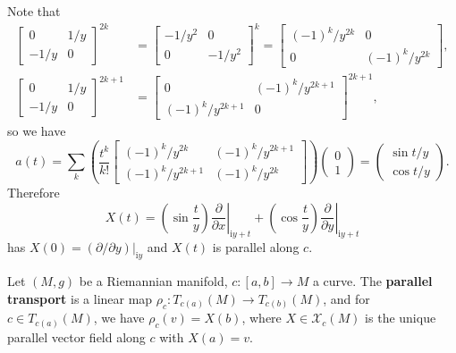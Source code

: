 \documentclass[letter-paper]{tufte-book}
\newenvironment{example}[1][Example]{\begin{trivlist}
\item[\hskip \labelsep {\bfseries #1}]}{\end{trivlist}}
\begin{document}
\begin{example}
  Note that
  \begin{align*}
    \left[\begin{matrix}0 & 1/y \\ -1/y & 0\end{matrix}\right]^{2k} 
      &= \left[\begin{matrix}-1/y^2 & 0 \\ 0 & -1/y^2\end{matrix}\right]^{k}
       = \left[\begin{matrix}(-1)^k/y^{2k} & 0 \\ 0 & (-1)^k/y^{2k}\end{matrix}\right],\\
    \left[\begin{matrix}0 & 1/y \\ -1/y & 0\end{matrix}\right]^{2k+1} 
      &= \left[\begin{matrix}0 & (-1)^k/y^{2k+1} \\ (-1)^k/y^{2k+1} & 0\end{matrix}\right]^{2k+1},
  \end{align*}
  so we have
  \begin{equation*}
    a(t) = \sum_k \left(\frac{t^k}{k!}\left[\begin{matrix}(-1)^k/y^{2k} & (-1)^k/y^{2k+1} \\ (-1)^k/y^{2k+1} & (-1)^k/y^{2k}\end{matrix}\right] \right)\begin{pmatrix}0\\ 1\end{pmatrix} = \begin{pmatrix}\sin t/y\\ \cos t/y\end{pmatrix}.
  \end{equation*}
  Therefore
  \begin{equation*}
    X(t) = \left(\sin\frac{t}{y}\right) \left.\frac{\partial}{\partial x}\right|_{\mathrm{i}y+t} + \left(\cos\frac{t}{y}\right) \left.\frac{\partial}{\partial y}\right|_{\mathrm{i}y+t}
  \end{equation*}
  has $X(0) = (\partial / \partial y)|_{\mathrm{i}y}$ and $X(t)$ is parallel along $c$.
\end{example}

Let $(M,g)$ be a Riemannian manifold, $c:[a,b] \to M$ a curve. The \textbf{parallel transport} is a linear map $\rho_c : T_{c(a)}(M) \to T_{c(b)}(M)$, and for $c \in T_{c(a)}(M)$, we have $\rho_c(v) = X(b)$, where $X \in \mathcal{X}_c(M)$ is the unique parallel vector field along $c$ with $X(a) = v$.
\end{document}
